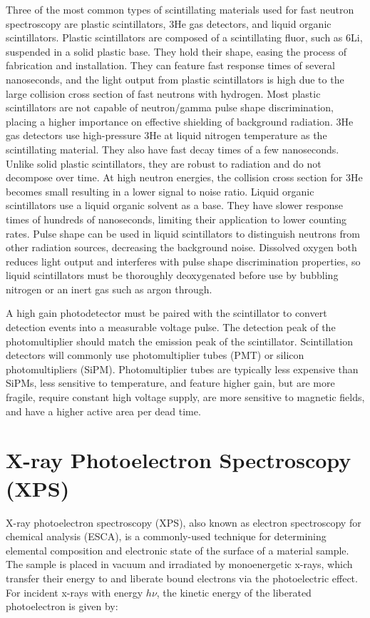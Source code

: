 \documentclass{jpp}
\begin{document}
Three of the most common types of scintillating materials used for fast neutron spectroscopy are plastic scintillators, 3He gas detectors, and liquid organic scintillators. Plastic scintillators are composed of a scintillating fluor, such as 6Li, suspended in a solid plastic base. They hold their shape, easing the process of fabrication and installation. They can feature fast response times of several nanoseconds, and the light output from plastic scintillators is high due to the large collision cross section of fast neutrons with hydrogen. Most plastic scintillators are not capable of neutron/gamma pulse shape discrimination, placing a higher importance on effective shielding of background radiation. 3He gas detectors use high-pressure 3He at liquid nitrogen temperature as the scintillating material. They also have fast decay times of a few nanoseconds. Unlike solid plastic scintillators, they are robust to radiation and do not decompose over time. At high neutron energies, the collision cross section for 3He becomes small resulting in a lower signal to noise ratio. Liquid organic scintillators use a liquid organic solvent as a base. They have slower response times of hundreds of nanoseconds, limiting their application to lower counting rates. Pulse shape can be used in liquid scintillators to distinguish neutrons from other radiation sources, decreasing the background noise. Dissolved oxygen both reduces light output and interferes with pulse shape discrimination properties, so liquid scintillators must be thoroughly deoxygenated before use by bubbling nitrogen or an inert gas such as argon through.

A high gain photodetector must be paired with the scintillator to convert detection events into a measurable voltage pulse. The detection peak of the photomultiplier should match the emission peak of the scintillator. Scintillation detectors will commonly use photomultiplier tubes (PMT) or silicon photomultipliers (SiPM). Photomultiplier tubes are typically less expensive than SiPMs, less sensitive to temperature, and feature higher gain, but are more fragile, require constant high voltage supply, are more sensitive to magnetic fields, and have a higher active area per dead time.

\section{X-ray Photoelectron Spectroscopy (XPS)}

X-ray photoelectron spectroscopy (XPS), also known as electron spectroscopy for chemical analysis (ESCA), is a commonly-used technique for determining elemental composition and electronic state of the surface of a material sample. The sample is placed in vacuum and irradiated by monoenergetic x-rays, which transfer their energy to and liberate bound electrons via the photoelectric effect. For incident x-rays with energy $h \nu$, the kinetic energy of the liberated photoelectron is given by:
\end{document}
